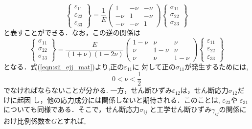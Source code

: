 \documentclass[10pt,a4j]{jbook}
\begin{document}
\begin{equation}
	\left\{ 
	\begin{array}{*{20}{c}}
	\varepsilon _{11}\\
	\varepsilon _{22}\\
	\varepsilon _{33}
	\end{array}
	\right\} 
	= 
	\frac{1}{E}\left( 
	\begin{array}{*{20}{c}}
	1& - \nu & - \nu \\
	 - \nu &1& - \nu \\
	 - \nu & - \nu &1
	\end{array}
	\right)
	\left\{ 
	\begin{array}{*{20}{c}}
	\sigma _{11}\\
	\sigma _{22}\\
	\sigma _{33}
	\end{array} 
	\right\}
	\label{eqn:eii_sjj_mat}
\end{equation}
と表すことができる．なお，この逆の関係は
\begin{equation}
	\left\{ 
	\begin{array}{*{20}{c}}
		\sigma _{11}\\
		\sigma _{22}\\
		\sigma _{33}
	\end{array} 
	\right\} 
	= 
	\frac{E}{\left( 1 + \nu  \right)\left( 1 - 2\nu  \right)}
	\left( 
		\begin{array}{*{20}{c}}
		1 - \nu & \nu &\nu \\
		\nu & 1 - \nu &\nu \\
		\nu &\nu &1 - \nu 
		\end{array}
	\right)
	\left\{ 
		\begin{array}{*{20}{c}}
		\varepsilon _{11}\\
		\varepsilon _{22}\\
		\varepsilon _{33}
		\end{array}
	\right\}
	\label{eqn:sii_ejj_mat}
\end{equation}
となる．式(\ref{eqn:sii_ejj_mat})より,正の$\varepsilon_{11}$に
対して正の$\sigma_{11}$が発生するためには,
\begin{equation}
	0< \nu < \frac{1}{2} 
\end{equation}
でなければならないことが分かる.
一方，せん断ひずみ$\varepsilon_{12}$は，せん断応力$\sigma_{12}$だけに起因
し，他の応力成分には関係しないと期待される．このことは, $\varepsilon_{23}$や
$\varepsilon_{31}$についても同様である．そこで，せん断応力$\sigma_{ij}$
と工学せん断ひずみ$\gamma_{ij}$の関係におけ比例係数を$G$とすれば,
\end{document}
